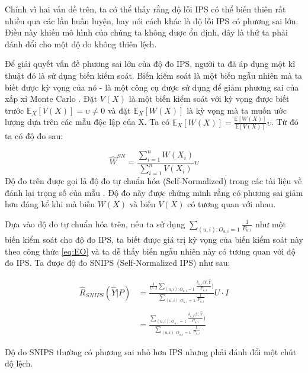 Chính vì hai vấn đề trên, ta có thể thấy rằng độ lỗi IPS có thể biến thiên rất nhiều qua các lần huấn luyện, hay nói cách khác là độ lỗi IPS có phương sai lớn. Điều này khiến mô hình của chúng ta không được ổn định, đây là thứ ta phải đánh đổi cho một độ đo không thiên lệch. 

Để giải quyết vấn đề phương sai lớn của độ đo IPS, người ta đã áp dụng một kĩ thuật đó là sử dụng biến kiểm soát. Biến kiểm soát là một biến ngẫu nhiên mà ta biết được kỳ vọng của nó - là một công cụ được sử dụng để giảm phương sai của xấp xỉ Monte Carlo \cite{mcbook}. Đặt $V(X)$ là một biến kiểm soát với kỳ vọng được biết trước $\mathbb{E}_{X}[V(X)] = \upsilon \ne 0$ và đặt $\mathbb{E}_{X}[W(X)]$ là kỳ vọng mà ta muốn ước lượng dựa trên các mẫu độc lập của X. Ta có $\mathbb{E}_{X}[W(X)] = \frac{\mathbb{E}[W(X)]}{\mathbb{E}[V(X)]} \upsilon$. Từ đó ta có độ đo sau:

\begin{equation}
    \hat{W}^{SN} = \frac{\sum^n_{i=1} W (X_i)}{\sum^n_{i=1} V (X_i)} \upsilon
\end{equation}
 Độ đo trên được gọi lả độ đo tự chuẩn hóa (Self-Normalized) trong các tài liệu về đánh lại trọng số của mẫu \cite{mcbook2}. Độ đo này được chứng minh rằng có phương sai giảm hơn đáng kể khi mà biến $W(X)$ và biến $V(X)$ có tương quan với nhau.
 
Dựa vào độ đo tự chuẩn hóa trên, nếu ta sử dụng $\sum_{(u,i):O_{u,i}=1} \frac{1}{P_{u,i}}$ như một biến kiểm soát cho độ đo IPS, ta biết được giá trị kỳ vọng của biến kiểm soát này theo công thức \ref{eq:EO} và ta dễ thấy biến ngẫu nhiên này có tương quan với độ đo IPS. Ta được độ đo SNIPS (Self-Normalized IPS) như sau: 

\begin{equation}
\begin{aligned}
    \label{eq:snips}
\hat{R}_{SNIPS}(\hat{Y}|P) &= \frac{\frac{1}{U \cdot I}\sum_{(u,i):O_{u,i}=1} \frac{ \delta_{u,i} (Y,\hat{Y}}{P_{u,i}})}{\sum_{(u,i):O_{u,i}=1} \frac{1}{P_{u,i}}} U \cdot I 
\\
\\ &= \frac{\sum_{(u,i):O_{u,i}=1} \frac{ \delta_{u,i} (Y,\hat{Y}}{P_{u,i}})}{\sum_{(u,i):O_{u,i}=1} \frac{1}{P_{u,i}}}
\end{aligned}
\end{equation}

Độ do SNIPS thường có phương sai nhỏ hơn IPS nhưng phải đánh đổi một chút độ lệch. 